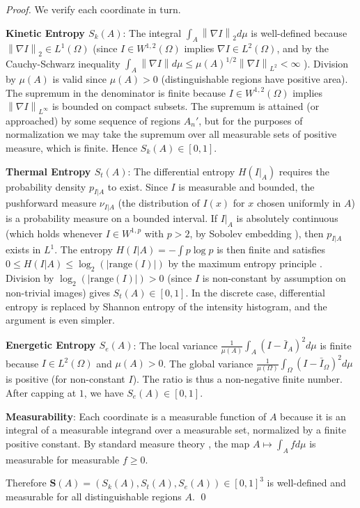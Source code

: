 \documentclass[twocolumn]{article}
\theoremstyle{plain}
\theoremstyle{definition}
\newcommand{\Sk}{S_k}
\newcommand{\St}{S_t}
\newcommand{\Se}{S_e}
\newcommand{\bS}{\mathbf{S}}
\newcommand{\norm}[1]{\left\lVert #1 \right\rVert}
\begin{document}
\begin{proof}
We verify each coordinate in turn.

\textbf{Kinetic Entropy $\Sk(A)$}: The integral $\int_A \norm{\nabla I}_2 d\mu$
is well-defined because $\norm{\nabla I}_2 \in L^1(\Omega)$ (since $I \in
W^{1,2}(\Omega)$ implies $\nabla I \in L^2(\Omega)$, and by the Cauchy-Schwarz
inequality $\int_A \norm{\nabla I} d\mu \leq \mu(A)^{1/2} \norm{\nabla I}_{L^2}
< \infty$ \cite{rudin1987real}). Division by $\mu(A)$ is valid since $\mu(A) > 0$
(distinguishable regions have positive area). The supremum in the denominator
is finite because $I \in W^{1,2}(\Omega)$ implies $\norm{\nabla I}_{L^\infty}$
is bounded on compact subsets. The supremum is attained (or approached) by some
sequence of regions $A_n'$, but for the purposes of normalization we may take the
supremum over all measurable sets of positive measure, which is finite. Hence
$\Sk(A) \in [0,1]$.

\textbf{Thermal Entropy $\St(A)$}: The differential entropy $H(I|_A)$ requires
the probability density $p_{I|A}$ to exist. Since $I$ is measurable and bounded,
the pushforward measure $\nu_{I|A}$ (the distribution of $I(x)$ for $x$ chosen
uniformly in $A$) is a probability measure on a bounded interval. If $I|_A$ is
absolutely continuous (which holds whenever $I \in W^{1,p}$ with $p > 2$, by
Sobolev embedding \cite{evans2010partial}), then $p_{I|A}$ exists in $L^1$.
The entropy $H(I|A) = -\int p \log p$ is then finite and satisfies $0 \leq
H(I|A) \leq \log_2(|\mathrm{range}(I)|)$ by the maximum entropy principle
\cite{cover2006elements}. Division by $\log_2(|\mathrm{range}(I)|) > 0$ (since
$I$ is non-constant by assumption on non-trivial images) gives $\St(A) \in [0,1]$.
In the discrete case, differential entropy is replaced by Shannon entropy of the
intensity histogram, and the argument is even simpler.

\textbf{Energetic Entropy $\Se(A)$}: The local variance
$\frac{1}{\mu(A)}\int_A (I - \bar{I}_A)^2 d\mu$ is finite because $I \in L^2(\Omega)$
and $\mu(A) > 0$. The global variance $\frac{1}{\mu(\Omega)}\int_\Omega (I -
\bar{I}_\Omega)^2 d\mu$ is positive (for non-constant $I$). The ratio is thus
a non-negative finite number. After capping at $1$, we have $\Se(A) \in [0,1]$.

\textbf{Measurability}: Each coordinate is a measurable function of $A$ because
it is an integral of a measurable integrand over a measurable set, normalized by
a finite positive constant. By standard measure theory \cite{halmos1950measure},
the map $A \mapsto \int_A f d\mu$ is measurable for measurable $f \geq 0$.

Therefore $\bS(A) = (\Sk(A), \St(A), \Se(A)) \in [0,1]^3$ is well-defined and
measurable for all distinguishable regions $A$. \qed
\end{proof}
\end{document}
